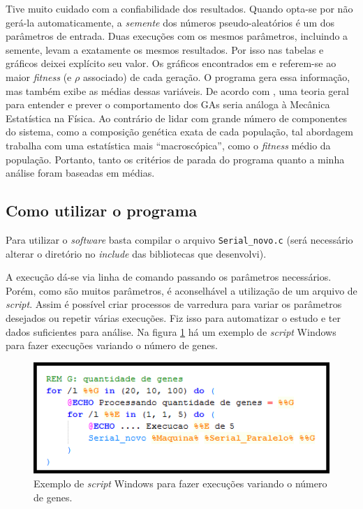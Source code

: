 	Tive muito cuidado com a confiabilidade dos resultados. Quando opta-se por não gerá-la automaticamente, a \emph{semente} dos números pseudo-aleatórios é um dos parâmetros de entrada. Duas execuções com os mesmos parâmetros, incluindo a semente, levam a exatamente os mesmos resultados. Por isso nas tabelas e gráficos deixei explícito seu valor. Os gráficos encontrados em \cite{metodo2004} e \cite{metodo2011} referem-se ao maior \emph{fitness} (e $\rho$ associado) de cada geração. O programa gera essa informação, mas também exibe as médias dessas variáveis. De acordo com \cite{Mitchell98}, uma teoria geral para entender e prever o comportamento dos GAs seria análoga à Mecânica Estatística na Física. Ao contrário de lidar com grande número de componentes do sistema, como a composição genética exata de cada população, tal abordagem trabalha com uma estatística mais ``macroscópica'', como o \emph{fitness} médio da população. Portanto, tanto os critérios de parada do programa quanto a minha análise foram baseadas em médias.
	
\subsection{Como utilizar o programa}
	
	Para utilizar o \emph{software} basta compilar o arquivo \texttt{Serial\_novo.c} (será necessário alterar o diretório no \emph{include} das bibliotecas que desenvolvi).
	
		A execução dá-se via linha de comando passando os parâmetros necessários. Porém, como são muitos parâmetros, é aconselhável a utilização de um arquivo de \emph{script}. Assim é possível criar processos de varredura para variar os parâmetros desejados ou repetir várias execuções. Fiz isso para automatizar o estudo e ter dados suficientes para análise. Na figura \ref{fig:script_windows} há um exemplo de \emph{script} Windows para fazer execuções variando o número de genes.
			
		\begin{figure}[htbp]
			\centering
				\includegraphics{figs/materiais_metodo/software/script_windows.png}
			\caption{Exemplo de \emph{script} Windows para fazer execuções variando o número de genes.}
			\label{fig:script_windows}
		\end{figure}

